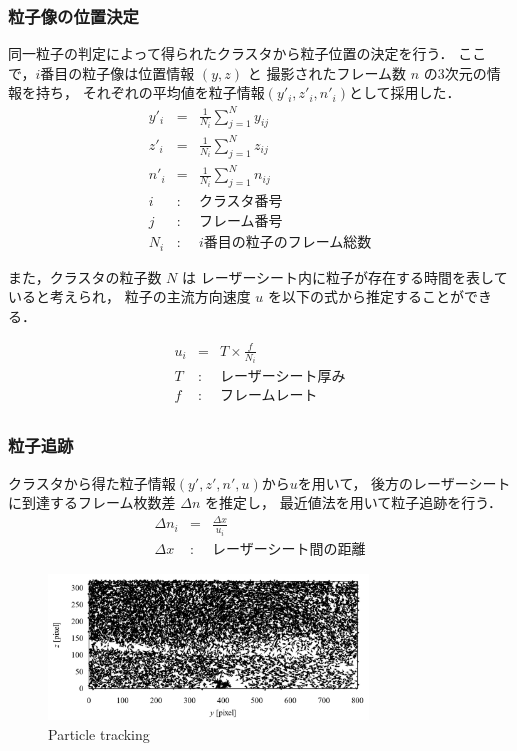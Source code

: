 \documentclass[twocolumn,a4j]{jsarticle}
\begin{document}
\subsubsection*{粒子像の位置決定}
同一粒子の判定によって得られたクラスタから粒子位置の決定を行う．
ここで，$i$番目の粒子像は位置情報 $(y, z)$ と
撮影されたフレーム数 $n$ の3次元の情報を持ち，
それぞれの平均値を粒子情報$(y'_i, z'_i, n'_i)$として採用した．
\begin{eqnarray*}
	y'_i &=& \frac{1}{N_i} \sum_{j=1}^{N} y_{ij} \\
	z'_i &=& \frac{1}{N_i} \sum_{j=1}^{N} z_{ij} \\
	n'_i &=& \frac{1}{N_i} \sum_{j=1}^{N} n_{ij} \\
	i &:& \text{クラスタ番号}\\
	j &:& \text{フレーム番号}\\
	N_i &:& i \text{番目の粒子のフレーム総数}
\end{eqnarray*}

また，クラスタの粒子数 $N$ は
レーザーシート内に粒子が存在する時間を表していると考えられ，
粒子の主流方向速度 $u$ を以下の式から推定することができる．

\begin{eqnarray*}
	u_i &=& T \times \frac{f}{N_i}\\
	T &:& \text{レーザーシート厚み} \\
	f &:& \text{フレームレート}\\
\end{eqnarray*}
\subsubsection*{粒子追跡}
クラスタから得た粒子情報$(y', z', n', u)$から$u$を用いて，
後方のレーザーシートに到達するフレーム枚数差 $\Delta n$ を推定し，
最近値法を用いて粒子追跡を行う．
\begin{eqnarray*}
	\Delta n_i &=& \frac{\Delta x}{u_i} \\
	\Delta x &:& \text{レーザーシート間の距離}
\end{eqnarray*}

\begin{figure}[htbp]
	\includegraphics[keepaspectratio, width=85mm]{../images/cluster_matching.png}
	\caption{Particle tracking}
\end{figure}
\end{document}
